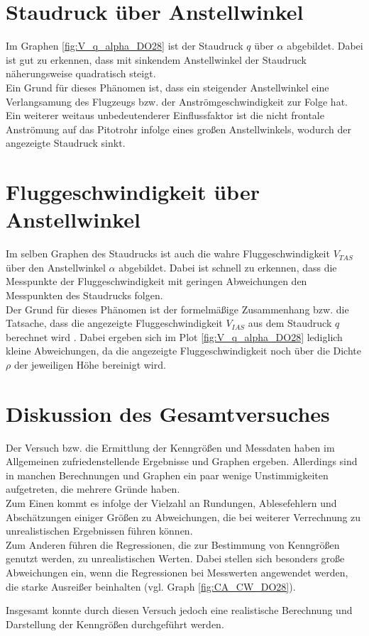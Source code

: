 \section{Staudruck über Anstellwinkel}

Im Graphen \ref{fig:V_q_alpha_DO28} ist der Staudruck $q$ über $\alpha$ abgebildet. Dabei ist gut zu erkennen, dass mit sinkendem Anstellwinkel der Staudruck näherungsweise quadratisch steigt. \\
Ein Grund für dieses Phänomen ist, dass ein steigender Anstellwinkel eine Verlangsamung des Flugzeugs bzw. der Anströmgeschwindigkeit zur Folge hat. \\ Ein weiterer weitaus unbedeutenderer Einflussfaktor ist die nicht frontale Anströmung auf das Pitotrohr infolge eines großen Anstellwinkels, wodurch der angezeigte Staudruck sinkt.

\section{Fluggeschwindigkeit über Anstellwinkel}

Im selben Graphen des Staudrucks ist auch die wahre Fluggeschwindigkeit $V_{TAS}$ über den Anstellwinkel $\alpha$ abgebildet. Dabei ist schnell zu erkennen, dass die Messpunkte der Fluggeschwindigkeit mit geringen Abweichungen den Messpunkten des Staudrucks folgen. \\
Der Grund für dieses Phänomen ist der formelmäßige Zusammenhang bzw. die Tatsache, dass die angezeigte Fluggeschwindigkeit $V_{IAS}$ aus dem Staudruck $q$ berechnet wird \cite{Skript}. Dabei ergeben sich im Plot \ref{fig:V_q_alpha_DO28} lediglich kleine Abweichungen, da die angezeigte Fluggeschwindigkeit noch über die Dichte $\rho$ der jeweiligen Höhe bereinigt wird.

\section{Diskussion des Gesamtversuches}

Der Versuch bzw. die Ermittlung der Kenngrößen und Messdaten haben im Allgemeinen zufriedenstellende Ergebnisse und Graphen ergeben. Allerdings sind in manchen Berechnungen und Graphen ein paar wenige Unstimmigkeiten aufgetreten, die mehrere Gründe haben.\\
Zum Einen kommt es infolge der Vielzahl an Rundungen, Ablesefehlern und Abschätzungen einiger Größen zu Abweichungen, die bei weiterer Verrechnung zu unrealistischen Ergebnissen führen können. \\ Zum Anderen führen die Regressionen, die zur Bestimmung von Kenngrößen genutzt werden, zu unrealistischen Werten. Dabei stellen sich besonders große Abweichungen ein, wenn die Regressionen bei Messwerten angewendet werden, die starke Ausreißer beinhalten (vgl. Graph \ref{fig:CA_CW_DO28}).

Insgesamt konnte durch diesen Versuch jedoch eine realistische  Berechnung und Darstellung der Kenngrößen durchgeführt werden.